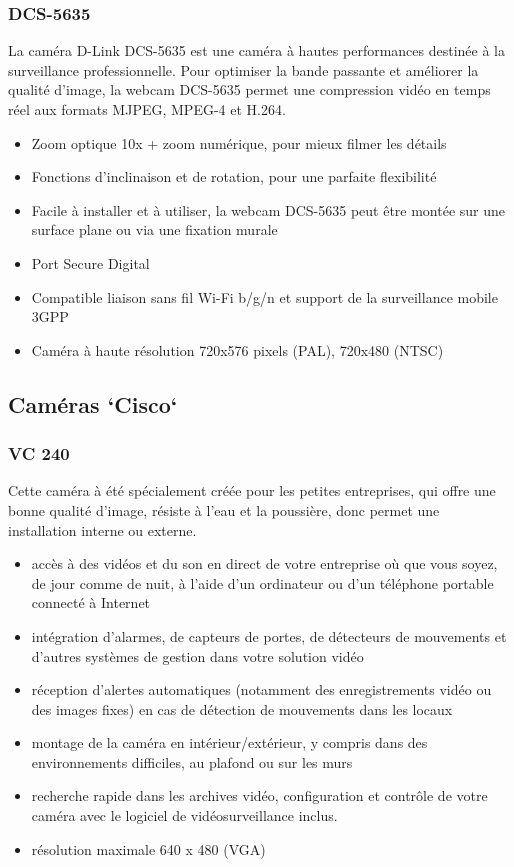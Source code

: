 \subsubsection{DCS-5635}
La caméra D-Link DCS-5635 est une caméra à hautes performances destinée à la
surveillance professionnelle.
Pour optimiser la bande passante et améliorer la qualité d'image, la webcam
DCS-5635 permet une compression vidéo en temps réel aux formats MJPEG, MPEG-4 et
H.264.
\begin{itemize}
  \item Zoom optique 10x + zoom numérique, pour mieux filmer les détails
  \item Fonctions d'inclinaison et de rotation, pour une parfaite flexibilité
  \item Facile à installer et à utiliser, la webcam DCS-5635 peut être montée sur une surface plane ou via une fixation murale
  \item Port Secure Digital
  \item Compatible liaison sans fil Wi-Fi b/g/n et support de la surveillance mobile 3GPP
  \item Caméra à haute résolution 720x576 pixels (PAL), 720x480 (NTSC)
\end{itemize}
\subsection{Caméras `Cisco`}
\subsubsection{VC 240}
Cette caméra à été spécialement créée pour les petites entreprises, qui offre
une bonne qualité d'image, résiste à l'eau et la poussière, donc permet une
installation interne ou externe.
\begin{itemize}
  \item accès à des vidéos et du son en direct de votre entreprise où que vous
  soyez, de jour comme de nuit, à l'aide d'un ordinateur ou d'un téléphone
  portable connecté à Internet
  \item intégration d'alarmes, de capteurs de portes, de détecteurs de mouvements
  et d'autres systèmes de gestion dans votre solution vidéo
  \item réception d'alertes automatiques (notamment des enregistrements vidéo ou
  des images fixes) en cas de détection de mouvements dans les locaux
  \item montage de la caméra en intérieur/extérieur, y compris dans des
  environnements difficiles, au plafond ou sur les murs
  \item recherche rapide dans les archives vidéo, configuration et contrôle de
  votre caméra avec le logiciel de vidéosurveillance inclus.
  \item résolution maximale 640 x 480 (VGA)
\end{itemize}

